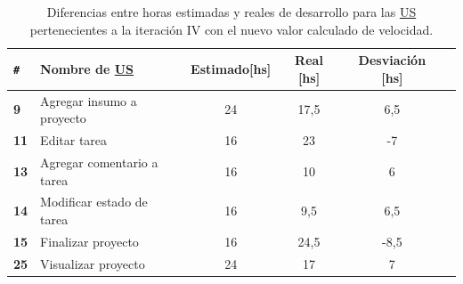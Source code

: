 \documentclass[a4paper, 12pt,twoside]{report}  %
\numberwithin{equation}{subsection} %
\begin{document}
\begin{table}[h!]
	\centering
	\captionsetup{justification=centering,margin=1.5cm}
	\begin{tabular}{ |p{0.5cm}|l|c|c|c|c| }
		\hline
		\verb|#|& \textbf{Nombre de \hyperlink{US}{US}}& \textbf{Estimado[hs]} & \textbf{Real [hs]} & \textbf{Desviación [hs]} \\
		\hline
		\textbf{9} & Agregar insumo a proyecto & 24 & 17,5 & \cellcolor{diferencia_estimacion_positiva}6,5 \\
		\hline
		\textbf{11} & Editar tarea & 16 & 23 & \cellcolor{diferencia_estimacion_negativa}-7 \\
		\hline
		\textbf{13} & Agregar comentario a tarea & 16 & 10 & \cellcolor{diferencia_estimacion_positiva}6 \\
		\hline
		\textbf{14} & Modificar estado de tarea & 16 & 9,5 & \cellcolor{diferencia_estimacion_positiva}6,5 \\
		\hline
		\textbf{15} & Finalizar proyecto & 16 & 24,5 & \cellcolor{diferencia_estimacion_negativa}-8,5 \\
		\hline
		\textbf{25} & Visualizar proyecto & 24 & 17 & \cellcolor{diferencia_estimacion_positiva}7 \\
		\hline
	\end{tabular}
	\caption{Diferencias entre horas estimadas y reales de desarrollo para las \protect\hyperlink{US}{US} pertenecientes a la iteración IV con el nuevo valor calculado de velocidad.}
	\label{tabla_dif_horas_estim_iter_4}
\end{table}
\end{document}
